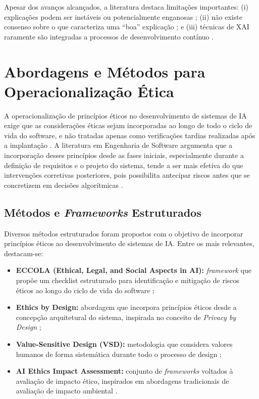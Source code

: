 Apesar dos avanços alcançados, a literatura destaca limitações importantes: (i) explicações podem ser instáveis ou potencialmente enganosas \cite{Rudin2019, S012, S041}; (ii) não existe consenso sobre o que caracteriza uma ``boa'' explicação \cite{Doshi-Velez2017, Lipton2018, S019, S033}; e (iii) técnicas de XAI raramente são integradas a processos de desenvolvimento contínuo \cite{Morley2020, S023, S044}.

\section{Abordagens e Métodos para Operacionalização Ética}
\label{sec:abordagens}

A operacionalização de princípios éticos no desenvolvimento de sistemas de IA exige que as considerações éticas sejam incorporadas ao longo de todo o ciclo de vida do software, e não tratadas apenas como verificações tardias realizadas após a implantação \cite{McNamara2018}. A literatura em Engenharia de Software argumenta que a incorporação desses princípios desde as fases iniciais, especialmente durante a definição de requisitos e o projeto do sistema, tende a ser mais efetiva do que intervenções corretivas posteriores, pois possibilita antecipar riscos antes que se concretizem em decisões algorítmicas \cite{Morley2020, Aydemir2018}.

\subsection{Métodos e \textit{Frameworks} Estruturados}
\label{sec:metodos}

Diversos métodos estruturados foram propostos com o objetivo de incorporar princípios éticos ao desenvolvimento de sistemas de IA. Entre os mais relevantes, destacam-se:

\begin{itemize}
    \item \textbf{ECCOLA (Ethical, Legal, and Social Aspects in AI):} \textit{framework} que propõe um checklist estruturado para identificação e mitigação de riscos éticos ao longo do ciclo de vida do software \cite{S012, S013};
    \item \textbf{Ethics by Design:} abordagem que incorpora princípios éticos desde a concepção arquitetural do sistema, inspirada no conceito de \textit{Privacy by Design} \cite{Cavoukian2009, S014, S025};
    \item \textbf{Value-Sensitive Design (VSD):} metodologia que considera valores humanos de forma sistemática durante todo o processo de design \cite{Friedman2019, Wynsberghe2013, S025};
    \item \textbf{AI Ethics Impact Assessment:} conjunto de \textit{frameworks} voltados à avaliação de impacto ético, inspirados em abordagens tradicionais de avaliação de impacto ambiental \cite{Moss2021, S042}.
\end{itemize}

